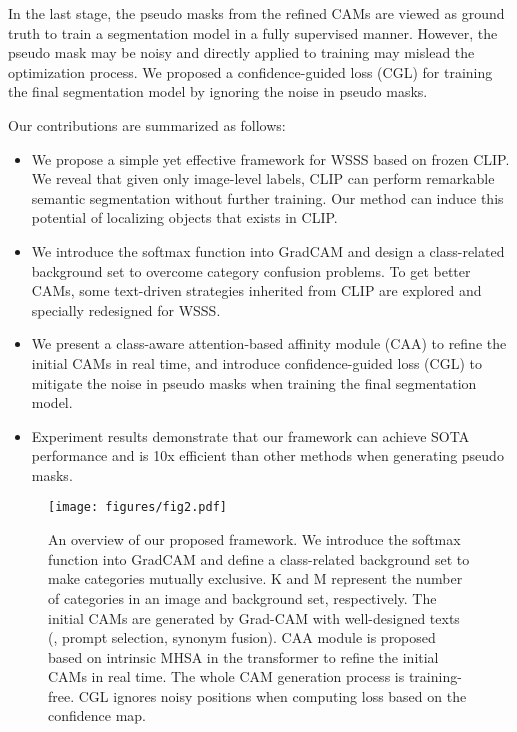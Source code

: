 \documentclass[10pt,twocolumn,letterpaper]{article}
\begin{document}
In the last stage, the pseudo masks from the refined CAMs are viewed as ground truth to train a segmentation model in a fully supervised manner. However, the pseudo mask may be noisy and directly applied to training may mislead the optimization process. We proposed a confidence-guided loss (CGL) for training the final segmentation model by ignoring the noise in pseudo masks. 


Our contributions are summarized as follows:
\begin{itemize}
	\item We propose a simple yet effective framework for WSSS based on frozen CLIP. We reveal that given only image-level labels, CLIP can perform remarkable semantic segmentation without further training. Our method can induce this potential of localizing objects that exists in CLIP.
    \item We introduce the softmax function into GradCAM and design a class-related background set to overcome category confusion problems. To get better CAMs, some text-driven strategies inherited from CLIP are explored and specially redesigned for WSSS.\item We present a class-aware attention-based affinity module (CAA) to refine the initial CAMs in real time, and introduce confidence-guided loss (CGL) to mitigate the noise in pseudo masks when training the final segmentation model. 
    \item  Experiment results demonstrate that our framework can achieve SOTA performance and is 10x efficient than other methods when generating pseudo masks. \end{itemize}



\begin{figure*}
  \centering
  \texttt{[image: figures/fig2.pdf]}
  \vspace{-2mm}
  \caption{An overview of our proposed framework. We introduce the softmax function into GradCAM and define a class-related background set to make categories mutually exclusive. K and M represent the number of categories in an image and background set, respectively. The initial CAMs are generated by Grad-CAM with well-designed texts (\eg, prompt selection, synonym fusion). CAA module is proposed based on intrinsic MHSA in the transformer to refine the initial CAMs in real time. The whole CAM generation process is training-free. CGL ignores noisy positions when computing loss based on the confidence map.}
  \vspace{-2mm}
  \label{fig:framework overview}
\end{figure*}
\end{document}

